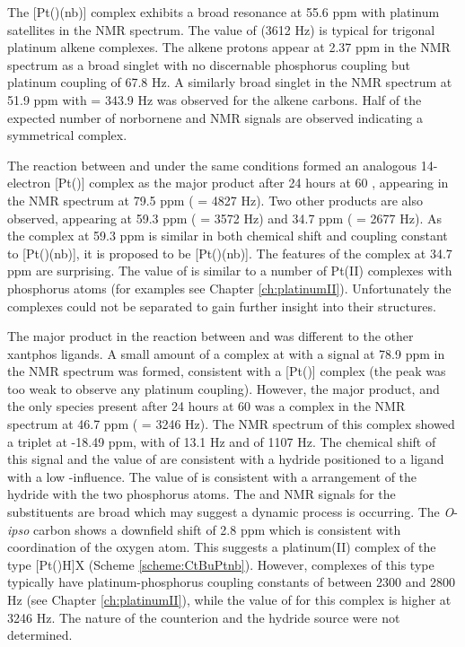
The [Pt(\tButhixantphos)(nb)] complex exhibits a broad resonance at 55.6 ppm with platinum satellites in the \phosphorus{} NMR spectrum.  The value of \JPtP{} (3612 Hz) is typical for trigonal platinum alkene complexes.\cite{Carr1991}  The alkene protons appear at 2.37 ppm in the \proton{} NMR spectrum as a broad singlet with no discernable phosphorus coupling but platinum coupling of 67.8 Hz. A similarly broad singlet in the \carbon{} NMR spectrum at 51.9 ppm with \JPtC{} = 343.9 Hz was observed for the alkene carbons.  Half of the expected number of norbornene and \tButhixantphos{} NMR signals are observed indicating a symmetrical complex.

The reaction between \tBusixantphos{} and \ce{[Pt(nb)3]} under the same conditions formed an analogous 14-electron [Pt(\tBusixantphos)] complex as the major product after 24 hours at 60 \degC{}, appearing in the \phosphorus{} NMR spectrum at 79.5 ppm (\JPtP{} = 4827 Hz).  Two other products are also observed, appearing at 59.3 ppm (\JPtP{} = 3572 Hz) and 34.7 ppm (\JPtP{} = 2677 Hz).  As the complex at 59.3 ppm is similar in both chemical shift and coupling constant to [Pt(\tButhixantphos)(nb)], it is proposed to be [Pt(\tBusixantphos)(nb)].  The features of the complex at 34.7 ppm are surprising.  The value of \JPtP{} is similar to a number of Pt(II) complexes with \trans{} phosphorus atoms (for examples see Chapter \ref{ch:platinumII}).  Unfortunately the complexes could not be separated to gain further insight into their structures.

The major product in the reaction between \tBuXantphos{} and \ce{[Pt(nb)3]} was different to the other xantphos ligands.  A small amount of a complex at with a signal at 78.9 ppm in the \phosphorus{} NMR spectrum was formed, consistent with a [Pt(\tBuxantphos)] complex (the peak was too weak to observe any platinum coupling).  However, the major product, and the only species present after 24 hours at 60\degC{} was a complex in the \phosphorus{} NMR spectrum at 46.7 ppm (\JPtP{} = 3246 Hz).  The \proton{} NMR spectrum of this complex showed a triplet at -18.49 ppm, with \JPH{} of 13.1 Hz and \JPtH{} of 1107 Hz.  The chemical shift of this signal and the value of \JPtH{} are consistent with a hydride positioned \trans{} to a ligand with a low \trans{}-influence.  The value of \JPH{} is consistent with a \cis{} arrangement of the hydride with the two phosphorus atoms.  The \proton{} and \carbon{} NMR signals for the \tBu{} substituents are broad which may suggest a dynamic process is occurring.  The \emph{O}-\emph{ipso} carbon shows a downfield shift of 2.8 ppm which is consistent with coordination of the oxygen atom.  This suggests a platinum(II) complex of the type [Pt(\tBuxantphosk)H]X (Scheme \ref{scheme:CtBuPtnb}).  However, complexes of this type typically have platinum-phosphorus coupling constants of between 2300 and 2800 Hz (see Chapter \ref{ch:platinumII}), while the value of \JPtP{} for this complex is higher at 3246 Hz.  The nature of the counterion and the hydride source were not determined.  

